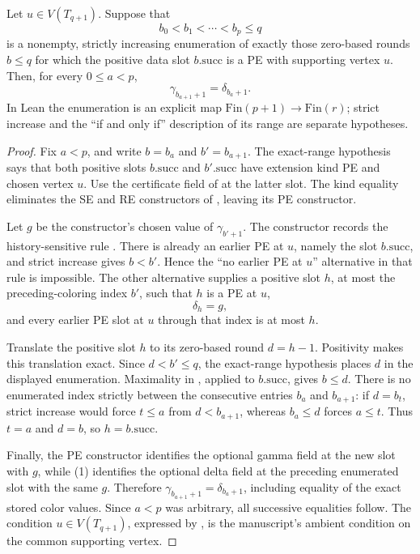 \begin{lemma}
Let \(u\in V(T_{q+1})\).  Suppose that
\[
 b_0<b_1<\cdots<b_p\leq q
\]
is a nonempty, strictly increasing enumeration of exactly those
zero-based rounds \(b\leq q\) for which the positive data slot
\(b.\mathrm{succ}\) is a PE with supporting vertex \(u\).  Then, for
every \(0\leq a<p\),
\[
 \gamma_{b_{a+1}+1}=\delta_{b_a+1}.
\]
In Lean the enumeration is an explicit map
\(\mathrm{Fin}(p+1)\to\mathrm{Fin}(r)\); strict increase and the
``if and only if'' description of its range are separate hypotheses.
\end{lemma}
\begin{proof}
Fix \(a<p\), and write \(b=b_a\) and \(b'=b_{a+1}\).  The exact-range
hypothesis says that both positive slots \(b.\mathrm{succ}\) and
\(b'.\mathrm{succ}\) have extension kind PE and chosen vertex \(u\).
Use the certificate field of  at the latter
slot.  The kind equality eliminates the SE and RE constructors of
, leaving its PE constructor.

Let \(g\) be the constructor's chosen value of \(\gamma_{b'+1}\).
The constructor records the history-sensitive rule
.  There is already an earlier PE at
\(u\), namely the slot \(b.\mathrm{succ}\), and strict increase gives
\(b<b'\).  Hence the ``no earlier PE at \(u\)'' alternative in that
rule is impossible.  The other alternative supplies a positive slot
\(h\), at most the preceding-coloring index \(b'\), such that
\(h\) is a PE at \(u\),
\[
 \delta_h=g,                                                     \tag{1}
\]
and every earlier PE slot at \(u\) through that index is at most
\(h\).

Translate the positive slot \(h\) to its zero-based round
\(d=h-1\).  Positivity makes this translation exact.  Since
\(d<b'\leq q\), the exact-range hypothesis places \(d\) in the displayed
enumeration.  Maximality in
, applied to
\(b.\mathrm{succ}\), gives \(b\leq d\).  There is no enumerated index
strictly between the consecutive entries \(b_a\) and \(b_{a+1}\): if
\(d=b_t\), strict increase would force \(t\leq a\) from \(d<b_{a+1}\),
whereas \(b_a\leq d\) forces \(a\leq t\).  Thus \(t=a\) and
\(d=b\), so \(h=b.\mathrm{succ}\).

Finally, the PE constructor identifies the optional gamma field at the
new slot with \(g\), while (1) identifies the optional delta field at the
preceding enumerated slot with the same \(g\).  Therefore
\(\gamma_{b_{a+1}+1}=\delta_{b_a+1}\), including equality of the exact
stored color values.  Since \(a<p\) was arbitrary, all successive
equalities follow.  The condition
\(u\in V(T_{q+1})\), expressed by
, is the manuscript's ambient condition
on the common supporting vertex.
\end{proof}

